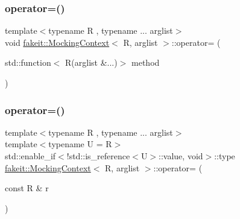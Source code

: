 \mbox{\label{classfakeit_1_1MockingContext_aadefb2bd6c1dee1f3aa8902277dd3fc2}} 
\subsubsection{\texorpdfstring{operator=()}{operator=()}\hspace{0.1cm}{\footnotesize\ttfamily [4/27]}}
{\footnotesize\ttfamily template$<$typename R , typename ... arglist$>$ \\
void \mbox{\hyperlink{classfakeit_1_1MockingContext}{fakeit\+::\+Mocking\+Context}}$<$ R, arglist $>$\+::operator= (\begin{DoxyParamCaption}\item[{std\+::function$<$ R(arglist \&...)$>$}]{method }\end{DoxyParamCaption})\hspace{0.3cm}{\ttfamily [inline]}}

\mbox{\label{classfakeit_1_1MockingContext_adfac3df2408adaa86efec81bd5533a6d}} 
\subsubsection{\texorpdfstring{operator=()}{operator=()}\hspace{0.1cm}{\footnotesize\ttfamily [5/27]}}
{\footnotesize\ttfamily template$<$typename R , typename ... arglist$>$ \\
template$<$typename U  = R$>$ \\
std\+::enable\+\_\+if$<$!std\+::is\+\_\+reference$<$U$>$\+::value, void$>$\+::type \mbox{\hyperlink{classfakeit_1_1MockingContext}{fakeit\+::\+Mocking\+Context}}$<$ R, arglist $>$\+::operator= (\begin{DoxyParamCaption}\item[{const R \&}]{r }\end{DoxyParamCaption})\hspace{0.3cm}{\ttfamily [inline]}}

